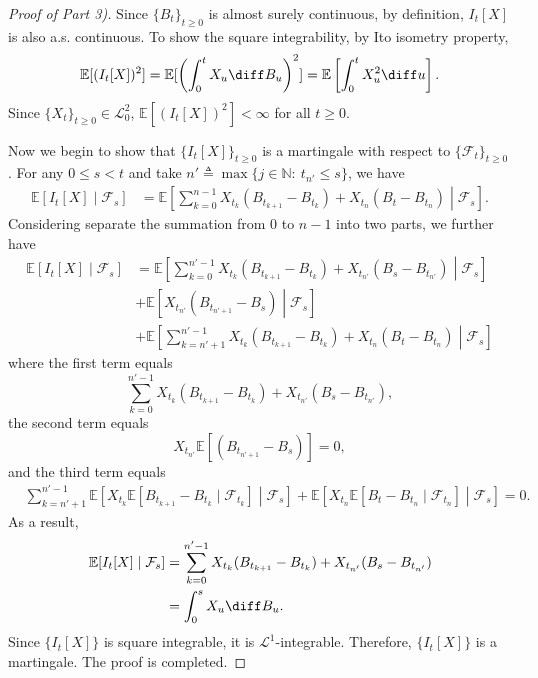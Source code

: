 \begin{proof}[Proof of Part 3)]
Since $\{B_t\}_{t\ge0}$ is almost surely continuous, by definition, $I_t[X]$ is also a.s. continuous.
To show the square integrability, by Ito isometry property, 
\[
\mathbb{E}[(I_t[X])^2]=\mathbb{E}[\left(\int_0^tX_u\diff B_u\right)^2]=\mathbb{E}\left[
\int_0^tX_u^2\diff u
\right].
\]
Since $\{X_t\}_{t\ge0}\in\mathcal{L}_0^2$, $\mathbb{E}[(I_t[X])^2]<\infty$ for all $t\ge0$.

Now we begin to show that $\{I_t[X]\}_{t\ge0}$ is a martingale with respect to $\{\mathcal{F}_t\}_{t\ge0}$.
For any $0\le s<t$ and take $n'\triangleq \max\{j\in\mathbb{N}:~t_{n'}\le s\}$, we have
\begin{align*}
\mathbb{E}[I_t[X]\mid\mathcal{F}_s]&=
\mathbb{E}\left[\sum_{k=0}^{n-1}X_{t_k}(B_{t_{k+1}}-B_{t_k}) + X_{t_n}(B_t - B_{t_n})
\middle|\mathcal{F}_s\right].
\end{align*}
Considering separate the summation from $0$ to $n-1$ into two parts, we further have
\begin{align*}
\mathbb{E}[I_t[X]\mid\mathcal{F}_s]&=
\mathbb{E}\left[\sum_{k=0}^{n'-1}X_{t_k}(B_{t_{k+1}}-B_{t_k}) + X_{t_{n'}}(B_s - B_{t_{n'}})
\middle|\mathcal{F}_s\right]\\
&+
\mathbb{E}\left[X_{t_{n'}}(B_{t_{n'+1}} - B_s)
\middle|\mathcal{F}_s\right]\\
&+
\mathbb{E}\left[\sum_{k=n'+1}^{n'-1}X_{t_k}(B_{t_{k+1}}-B_{t_k}) + X_{t_{n}}(B_t - B_{t_{n}})
\middle|\mathcal{F}_s\right]
\end{align*}
where the first term equals 
\[
\sum_{k=0}^{n'-1}X_{t_k}(B_{t_{k+1}}-B_{t_k})+X_{t_{n'}}(B_s - B_{t_{n'}}),
\]
the second term equals 
\[
X_{t_{n'}}\mathbb{E}\left[(B_{t_{n'+1}} - B_s)\right]=0,
\]
and the third term equals 
\begin{align*}
&\sum_{k=n'+1}^{n'-1}\mathbb{E}\left[
X_{t_k}\mathbb{E}[B_{t_{k+1}}-B_{t_k}\mid\mathcal{F}_{t_k}]
\middle|\mathcal{F}_s\right]+
\mathbb{E}\left[
X_{t_n}\mathbb{E}[B_{t}-B_{t_n}\mid\mathcal{F}_{t_n}]
\middle|\mathcal{F}_s\right]=0.
\end{align*}
As a result,
\begin{align*}
\mathbb{E}[I_t[X]\mid\mathcal{F}_s]&=\sum_{k=0}^{n'-1}X_{t_k}(B_{t_{k+1}}-B_{t_k})+X_{t_{n'}}(B_s - B_{t_{n'}})\\&=\int_0^sX_u\diff B_u.
\end{align*}
Since $\{I_t[X]\}$ is square integrable, it is $\mathcal{L}^1$-integrable.
Therefore, $\{I_t[X]\}$ is a martingale.
The proof is completed.
\end{proof}
